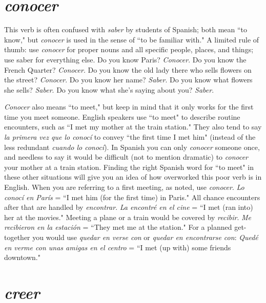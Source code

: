 \section{\emph{conocer}}

This verb is often confused with \emph{saber} by students of Spanish;
both mean ``to know," but \emph{conocer} is used in the sense of ``to be familiar with." A limited rule of thumb: use \emph{conocer} for proper nouns and
all specific people, places, and things; use saber for everything else. Do
you know Paris? \emph{Conocer}. Do you know the French Quarter? \emph{Conocer}.
Do you know the old lady there who sells flowers on the street? \emph{Conocer}. Do you know her name? \emph{Saber}. Do you know what flowers she
sells? \emph{Saber}. Do you know what she's saying about you? \emph{Saber}.

\emph{Conocer} also means ``to meet," but keep in mind that it only
works for the first time you meet someone. English speakers use ``to
meet" to describe routine encounters, such as ``I met my mother at
the train station." They also tend to say \emph{la primera vez que lo conocí}
to convey ``the first time I met him" (instead of the less redundant
\emph{cuando lo conocí}). In Spanish you can only \emph{conocer} someone once, and
needless to say it would be difficult (not to mention dramatic) to \emph{conocer} your mother at a train station. Finding the right Spanish word for
``to meet" in these other situations will give you an idea of how overworked this poor verb is in English. When you are referring to a first
meeting, as noted, use \emph{conocer}. \emph{Lo conocí en París} = ``I met him (for
the first time) in Paris." All chance encounters after that are handled
by \emph{encontrar}. \emph{La encontré en el cine} = ``I met (ran into) her at the
movies." Meeting a plane or a train would be covered by \emph{recibir}. \emph{Me
recibieron en la estación} = ``They met me at the station." For a
planned get-together you would use \emph{quedar en verse con} or \emph{quedar en
encontrarse con}: \emph{Quedé en verme con unas amigas en el centro} = ``I
met (up with) some friends downtown."

\section{\emph{creer}}

